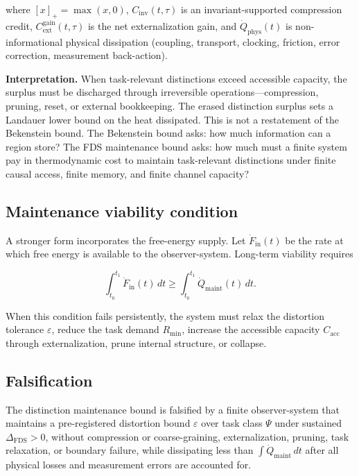 \documentclass[10pt,a4paper,twocolumn,aps,prl]{revtex4-2}
\begin{document}
where $[x]_+=\max(x,0)$, $C_{\mathrm{inv}}(t,\tau)$ is an invariant-supported compression credit, $C_{\mathrm{ext}}^{\mathrm{gain}}(t,\tau)$ is the net externalization gain, and $\dot Q_{\mathrm{phys}}(t)$ is non-informational physical dissipation (coupling, transport, clocking, friction, error correction, measurement back-action).

\noindent\textbf{Interpretation.} When task-relevant distinctions exceed accessible capacity, the surplus must be discharged through irreversible operations---compression, pruning, reset, or external bookkeeping. The erased distinction surplus sets a Landauer lower bound on the heat dissipated. This is not a restatement of the Bekenstein bound. The Bekenstein bound asks: how much information can a region store? The FDS maintenance bound asks: how much must a finite system pay in thermodynamic cost to maintain task-relevant distinctions under finite causal access, finite memory, and finite channel capacity?

\subsection{Maintenance viability condition}

A stronger form incorporates the free-energy supply. Let $\dot F_{\mathrm{in}}(t)$ be the rate at which free energy is available to the observer-system. Long-term viability requires

\begin{equation}
\boxed{
\int_{t_0}^{t_1}
\dot F_{\mathrm{in}}(t)\,dt
\geq
\int_{t_0}^{t_1}
\dot Q_{\mathrm{maint}}(t)\,dt
}.
\label{eq:viability}
\end{equation}

When this condition fails persistently, the system must relax the distortion tolerance $\varepsilon$, reduce the task demand $R_{\min}$, increase the accessible capacity $C_{\mathrm{acc}}$ through externalization, prune internal structure, or collapse.

\subsection{Falsification}

The distinction maintenance bound is falsified by a finite observer-system that maintains a pre-registered distortion bound $\varepsilon$ over task class $\Psi$ under sustained $\Delta_{\mathrm{FDS}}>0$, without compression or coarse-graining, externalization, pruning, task relaxation, or boundary failure, while dissipating less than $\int\dot Q_{\mathrm{maint}}\,dt$ after all physical losses and measurement errors are accounted for.
\end{document}
